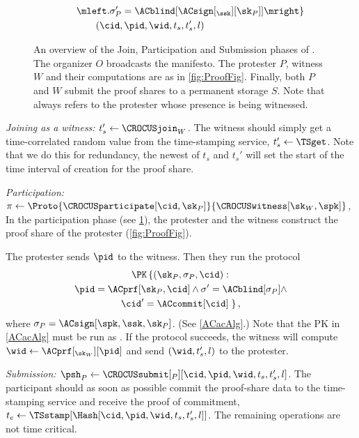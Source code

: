 \begin{figure}
\begin{minipage}{\linewidth}
\begin{align*}
        & \qquad \mleft. \sigma_P' = \ACblind[\ACsign[_{\ssk}][\sk_P]] \mright\} 
        \\
        & \qquad\qquad (\cid, \pid, \wid, t_s, t_s', l)
    \end{align*}
  \end{minipage}
  \caption{%
    An overview of the Join, Participation and Submission phases of \CROCUS.\@
    The organizer \(O\) broadcasts the manifesto.
    The protester \(P\), witness \(W\) and their computations are as in \cref{fig:ProofFig}.
    Finally, both \(P\) and \(W\) submit the proof shares to a
    permanent storage \(S\). Note that \pid always refers to the
    protester whose presence is being witnessed.
  }%
  \label{fig:ProtocolOverview}
\end{figure}

\emph{Joining as a witness: \(t_s'\gets \CROCUSjoin_W\).}
The witness should simply get a time-correlated random value from the time-stamping service, \(t_s'\gets \TSget\).
Note that we do this for redundancy, the newest of \(t_s\) and \(t_s'\) will 
set the start of the time interval of creation for the proof share.


\emph{Participation: \(\pi\gets
    \Proto{\CROCUSparticipate[\cid, \sk_P]}{\CROCUSwitness[\sk_W, \spk]}\),}
In the participation phase (see \cref{fig:ProtocolOverview}), the protester and 
the witness construct the proof share of the protester (\cref{fig:ProofFig}).

The protester sends \(\pid\) to the witness.
Then they run the protocol
\begin{multline*}
  \PK\left\{ (\sk_P, \sigma_P, \cid): \right.\\
    \pid = \ACprf[\sk_P, \cid] \land \sigma' = \ACblind[\sigma_P] \land \\
    \cid' = \ACcommit[\cid]
  \left.\right\},
\end{multline*}
where \(\sigma_P = \ACsign[\spk, \ssk, \sk_P]\).
(See \cref{ACacAlg}.)
Note that the \ac{PK} in \cref{ACacAlg} must be run as .
If the protocol succeeds, the witness will compute \(\wid \gets 
  \ACprf[_{\sk_W}][\pid]\) and send \((\wid, t_s', l)\) to the protester.


\emph{Submission: \(\psh_P\gets \CROCUSsubmit[_P][\cid, \pid, \wid, t_s, t_s',  l]\).}
The participant should as soon as possible commit the proof-share data to the 
time-stamping service and receive the proof of commitment, \(t_e\gets 
  \TSstamp[\Hash[\cid, \pid, \wid, t_s, t_s', l]]\).
The remaining operations are not time critical.


